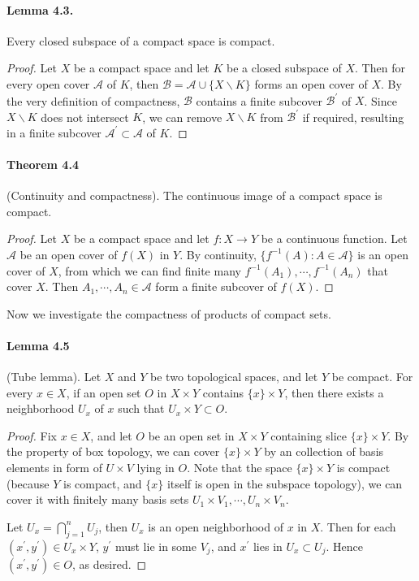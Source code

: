 \documentclass{article}
\numberwithin{equation}{section}
\theoremstyle{plain}
\theoremstyle{definition}
\begin{document}
\paragraph{Lemma 4.3.\label{lemma:4.3}} Every closed subspace of a compact space is compact.
\begin{proof}
Let $X$ be a compact space and let $K$ be a closed subspace of $X$. Then for every open cover $\mathscr{A}$ of $K$, then $\mathscr{B}=\mathscr{A}\cup\{X\backslash K\}$ forms an open cover of $X$. By the very definition of compactness, $\mathscr{B}$ contains a finite subcover $\mathscr{B}^\prime$ of $X$. Since $X\backslash K$ does not intersect $K$, we can remove $X\backslash K$ from $\mathscr{B}^\prime$ if required, resulting in a finite subcover $\mathscr{A}^\prime\subset\mathscr{A}$ of $K$.
\end{proof}

\paragraph{Theorem 4.4\label{thm:4.4}} (Continuity and compactness). The continuous image of a compact space is compact.
\begin{proof}
	Let $X$ be a compact space and let $f:X\to Y$ be a continuous function. Let $\mathscr{A}$ be an open cover of $f(X)$ in $Y$. By continuity, $\{f^{-1}(A):A\in\mathscr{A}\}$ is an open cover of $X$, from which we can find finite many $f^{-1}(A_1),\cdots,f^{-1}(A_n)$ that cover $X$. Then $A_1,\cdots,A_n\in\mathscr{A}$ form a finite subcover of $f(X)$.
\end{proof}

Now we investigate the compactness of products of compact sets.

\paragraph{Lemma 4.5\label{lemma:4.5}} (Tube lemma). Let $X$ and $Y$ be two topological spaces, and let $Y$ be compact. For every $x\in X$, if an open set $O$ in $X\times Y$ contains $\{x\}\times Y$, then there exists a neighborhood $U_x$ of $x$ such that $U_x\times Y\subset O$.
\begin{proof}
Fix $x\in X$, and let $O$ be an open set in $X\times Y$ containing slice $\{x\}\times Y$. By the property of box topology, we can cover $\{x\}\times Y$ by an collection of basis elements in form of $U\times V$ lying in $O$. Note that the space $\{x\}\times Y$ is compact (because $Y$ is compact, and $\{x\}$ itself is open in the subspace topology), we can cover it with finitely many basis sets $U_1\times V_1,\cdots,U_n\times V_n$. 

Let $U_x=\bigcap_{j=1}^n U_j$, then $U_x$ is an open neighborhood of $x$ in $X$. Then for each $(x^\prime,y^\prime)\in U_x\times Y$, $y^\prime$ must lie in some $V_j$, and $x^\prime$ lies in $U_x\subset U_j$. Hence $(x^\prime,y^\prime)\in O$, as desired.
\end{proof}
\end{document}
